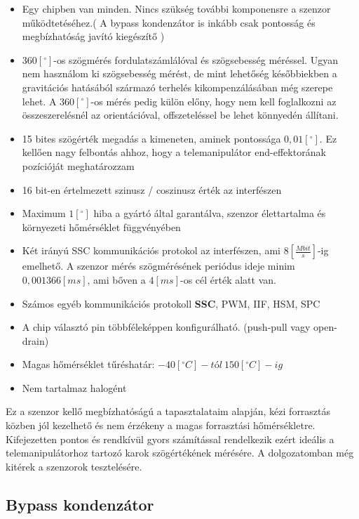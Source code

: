 \begin{itemize}
	\item Egy chipben van minden. Nincs szükség további komponensre a szenzor működtetéséhez.( A bypass kondenzátor is inkább csak pontosság és megbízhatóság javító kiegészítő )
	\item $360[^\circ]$-os szögmérés fordulatszámlálóval és szögsebesség méréssel. Ugyan nem használom ki szögsebesség mérést, de mint lehetőség későbbiekben a gravitációs hatásából származó terhelés kikompenzálásában még szerepe lehet. A $360[^\circ]$-os mérés pedig külön előny, hogy nem kell foglalkozni az összeszerelésnél az orientációval, offszeteléssel be lehet könnyedén állítani.
	\item 15 bites szögérték megadás a kimeneten, aminek pontossága $0,01[^\circ]$. Ez kellően nagy felbontás ahhoz, hogy a telemanipulátor end-effektorának pozícióját meghatározzam
	\item 16 bit-en értelmezett szinusz / coszinusz érték az interfészen
	\item Maximum $1[^\circ]$ hiba a gyártó által garantálva, szenzor élettartalma és környezeti hőmérséklet függvényében
	\item Két irányú SSC kommunikációs protokol az interfészen, ami $8[\frac{Mbit}{s}]$-ig emelhető. A szenzor mérés szögmérésének periódus ideje minim $0,001366[ms]$, ami bőven a $4[ms]$-os cél érték alatt van.
	\item Számos egyéb kommunikációs protokoll \textbf{SSC}, PWM, IIF, HSM, SPC
	\item A chip választó pin többféleképpen konfigurálható. (push-pull vagy open-drain)
 	\item Magas hőmérséklet tűréshatár: $-40[^\circ C]-tól~150[^\circ C]-ig$
	\item Nem tartalmaz halogént
\end{itemize}

Ez a szenzor kellő megbízhatóságú a tapasztalataim alapján, kézi forrasztás közben jól kezelhető és nem érzékeny a magas forrasztási hőmérsékletre. Kifejezetten pontos és rendkívül gyors számítással rendelkezik ezért ideális a telemanipulátorhoz tartozó karok szögértékének mérésére. A dolgozatomban még kitérek a szenzorok tesztelésére.

\subsection{Bypass kondenzátor}

